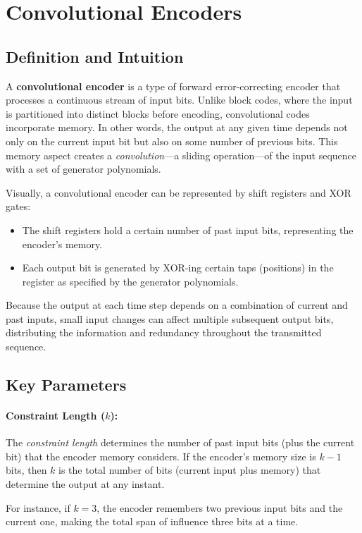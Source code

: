 \documentclass[12pt,a4paper]{article}
\begin{document}
\section{Convolutional Encoders}

\subsection{Definition and Intuition}

A \textbf{convolutional encoder} is a type of forward error-correcting encoder that processes a continuous stream of input bits. Unlike block codes, where the input is partitioned into distinct blocks before encoding, convolutional codes incorporate memory. In other words, the output at any given time depends not only on the current input bit but also on some number of previous bits. This memory aspect creates a \emph{convolution}—a sliding operation—of the input sequence with a set of generator polynomials.

Visually, a convolutional encoder can be represented by shift registers and XOR gates:
\begin{itemize}
    \item The shift registers hold a certain number of past input bits, representing the encoder's memory.
    \item Each output bit is generated by XOR-ing certain taps (positions) in the register as specified by the generator polynomials.
\end{itemize}
Because the output at each time step depends on a combination of current and past inputs, small input changes can affect multiple subsequent output bits, distributing the information and redundancy throughout the transmitted sequence.

\subsection{Key Parameters}

\paragraph{Constraint Length ($k$):}  
The \emph{constraint length} determines the number of past input bits (plus the current bit) that the encoder memory considers. If the encoder's memory size is $k-1$ bits, then $k$ is the total number of bits (current input plus memory) that determine the output at any instant.

For instance, if $k=3$, the encoder remembers two previous input bits and the current one, making the total span of influence three bits at a time.
\end{document}
